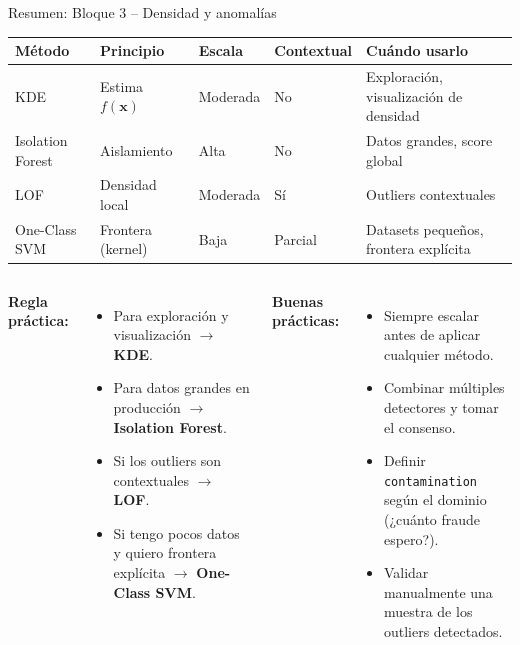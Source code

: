\documentclass[aspectratio=169]{beamer}
\begin{document}
\begin{frame}{Resumen: Bloque 3 -- Densidad y anomalías}
\begin{center}
\renewcommand{\arraystretch}{1.4}
{\small
\begin{tabular}{lllll}
\toprule
\textbf{Método} & \textbf{Principio} & \textbf{Escala} & \textbf{Contextual} & \textbf{Cuándo usarlo} \\
\midrule
KDE             & Estima $f(\mathbf{x})$ & Moderada & No & Exploración, visualización de densidad \\
Isolation Forest & Aislamiento        & Alta     & No & Datos grandes, score global \\
LOF             & Densidad local      & Moderada & Sí & Outliers contextuales \\
One-Class SVM   & Frontera (kernel)   & Baja     & Parcial & Datasets pequeños, frontera explícita \\
\bottomrule
\end{tabular}
}
\end{center}

\medskip
\begin{columns}[T]
\textbf{Regla práctica:}
\begin{itemize}
  \item Para exploración y visualización $\to$ \textbf{KDE}.
  \item Para datos grandes en producción $\to$ \textbf{Isolation Forest}.
  \item Si los outliers son contextuales $\to$ \textbf{LOF}.
  \item Si tengo pocos datos y quiero frontera explícita $\to$ \textbf{One-Class SVM}.
\end{itemize}

\textbf{Buenas prácticas:}
\begin{itemize}
  \item Siempre escalar antes de aplicar cualquier método.
  \item Combinar múltiples detectores y tomar el consenso.
  \item Definir \texttt{contamination} según el dominio (¿cuánto fraude espero?).
  \item Validar manualmente una muestra de los outliers detectados.
\end{itemize}
\end{columns}
\end{frame}
\end{document}
